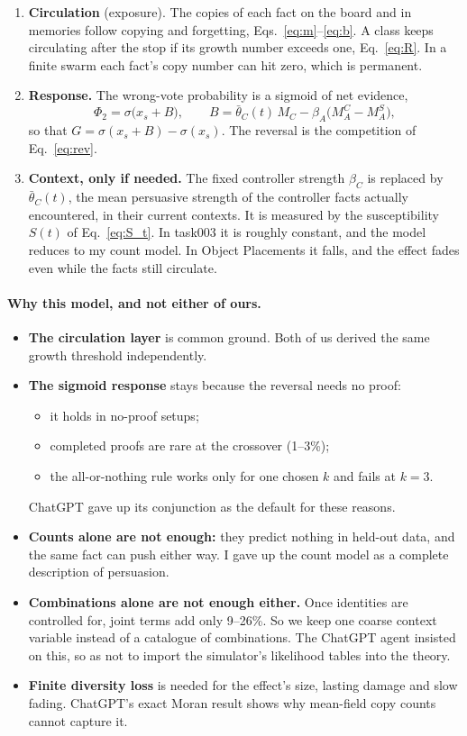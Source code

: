 \documentclass[10pt,a4paper]{article}
\begin{document}
\begin{enumerate}
\item \textbf{Circulation} (exposure). The copies of each fact on the board and in memories follow copying and
  forgetting, Eqs.~\eqref{eq:m}--\eqref{eq:b}. A class keeps circulating after the stop if its growth number exceeds one,
  Eq.~\eqref{eq:R}. In a finite swarm each fact's copy number can hit zero, which is permanent.
\item \textbf{Response.} The wrong-vote probability is a sigmoid of net evidence,
  \begin{equation}
  \Phi_2=\sigma\big(x_s+B\big),\qquad B=\bar\theta_C(t)\,M_C-\beta_A\big(M_A^{C}-M_A^{S}\big),\label{eq:common}
  \end{equation}
  so that $G=\sigma(x_s+B)-\sigma(x_s)$. The reversal is the competition of Eq.~\eqref{eq:rev}.
\item \textbf{Context, only if needed.} The fixed controller strength $\beta_C$ is replaced by $\bar\theta_C(t)$, the
  mean persuasive strength of the controller facts actually encountered, in their current contexts. It is measured by
  the susceptibility $S(t)$ of Eq.~\eqref{eq:S_t}. In task003 it is roughly constant, and the model reduces to my
  count model. In Object Placements it falls, and the effect fades even while the facts still circulate.
\end{enumerate}

\paragraph{Why this model, and not either of ours.}
\begin{itemize}
\item \textbf{The circulation layer} is common ground. Both of us derived the same growth threshold independently.
\item \textbf{The sigmoid response} stays because the reversal needs no proof:
  \begin{itemize}
  \item it holds in no-proof setups;
  \item completed proofs are rare at the crossover (1--3\%);
  \item the all-or-nothing rule works only for one chosen $k$ and fails at $k=3$.
  \end{itemize}
  ChatGPT gave up its conjunction as the default for these reasons.
\item \textbf{Counts alone are not enough:} they predict nothing in held-out data, and the same fact can push either
  way. I gave up the count model as a complete description of persuasion.
\item \textbf{Combinations alone are not enough either.} Once identities are controlled for, joint terms add only
  9--26\%. So we keep one coarse context variable instead of a catalogue of combinations. The ChatGPT agent insisted on
  this, so as not to import the simulator's likelihood tables into the theory.
\item \textbf{Finite diversity loss} is needed for the effect's size, lasting damage and slow fading. ChatGPT's exact
  Moran result shows why mean-field copy counts cannot capture it.
\end{itemize}
\end{document}

